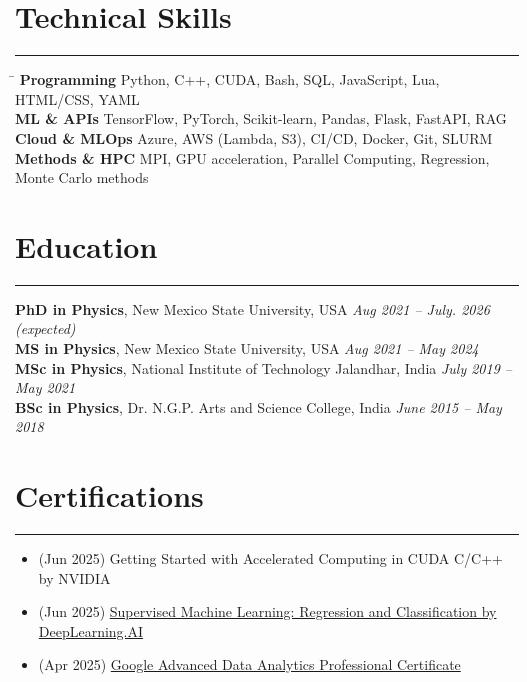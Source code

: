 \documentclass[11pt]{article}
\begin{document}
\section*{Technical Skills}
\hrule
\vspace{-0.3em}
\begin{tabbing}
\hspace{3.5cm} \= \kill
\textbf{Programming} \> Python, C++, CUDA, Bash, SQL, JavaScript, Lua, HTML/CSS, YAML \\
\textbf{ML \& APIs} \> TensorFlow, PyTorch, Scikit-learn, Pandas, Flask, FastAPI, RAG\\
\textbf{Cloud \& MLOps} \> Azure, AWS (Lambda, S3), CI/CD, Docker, Git, SLURM\\
\textbf{Methods \& HPC} \> MPI, GPU acceleration, Parallel Computing, Regression, Monte Carlo methods
\end{tabbing}

\section*{Education}
\hrule
\vspace{0.3em}

\textbf{PhD in Physics}, New Mexico State University, USA \hfill \textit{Aug 2021 – July. 2026 (expected)} \\
\textbf{MS in Physics}, New Mexico State University, USA \hfill \textit{Aug 2021 – May 2024} \\
\textbf{MSc in Physics}, National Institute of Technology Jalandhar, India \hfill \textit{July 2019 – May 2021} \\
\textbf{BSc in Physics}, Dr. N.G.P. Arts and Science College, India \hfill \textit{June 2015 – May 2018}


\section*{Certifications}
\hrule
\vspace{-0.3em}
\begin{itemize}
    \item (Jun 2025) Getting Started with Accelerated Computing in CUDA C/C++ by NVIDIA
    \item (Jun 2025) \href{https://coursera.org/share/b9cffe9c5ba5832ffb99bf7abdd8c384}{Supervised Machine Learning: Regression and Classification by DeepLearning.AI} 
    \item (Apr 2025) \href{https://www.coursera.org/account/accomplishments/professional-cert/certificate/U0HU8UKT89L4}{Google Advanced Data Analytics Professional Certificate} 
\end{itemize}
\end{document}
